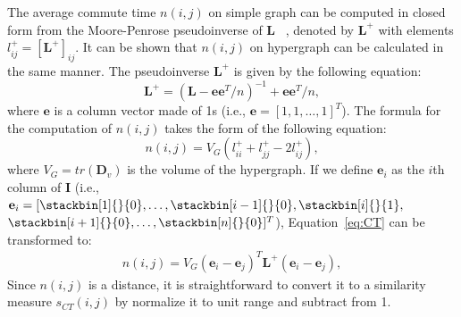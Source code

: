 The average commute time $n(i,j)$ on simple graph can be computed in closed form from the Moore-Penrose pseudoinverse of $\mathbf{L}$ ~\cite{pseudo}, denoted by $\mathbf{L}^+$ with elements $l_{ij}^+=[\mathbf{L}^+]_{ij}$. It can be shown that $n(i,j)$ on hypergraph can be calculated in the same manner. The pseudoinverse $\mathbf{L}^+$ is given by the following equation:
\begin{equation}
\mathbf{L}^+=(\mathbf{L} -\mathbf{ee}^T/n)^{-1} + \mathbf{ee}^T/n, \label{eq:pL}
\end{equation}
where $\mathbf{e}$ is a column vector made of 1s (i.e., $\mathbf{e}=[1,1,\ldots,1]^T$). The formula for the computation of $n(i,j)$ takes the form of the following equation:
\begin{equation}
n(i,j)=V_G(l_{ii}^+ + l_{jj}^+ - 2l_{ij}^+) \label{eq:CT},
\end{equation}
where $V_G = tr(\mathbf{D}_v)$ is the volume of the hypergraph. If we define $\mathbf{e}_i$ as the $i$th column of $\mathbf{I}$ (i.e.,
$
\mathbf{e}_i=[\stackbin[1]{}{0}, \ldots, \stackbin[i-1]{}{0}, \stackbin[i]{}{1},$
$ \stackbin[i+1]{}{0}, \ldots, \stackbin[n]{}{0}]^T
$),
Equation~\ref{eq:CT} can be transformed to:
\begin{align}
n(i,j)=V_G(\mathbf{e}_i-\mathbf{e}_j)^T\mathbf{L}^+(\mathbf{e}_i-\mathbf{e}_j), \label{eq:CT2}
\end{align}
Since $n(i,j)$ is a distance, it is straightforward to convert it to a similarity measure $s_{CT}(i,j)$ by normalize it to unit range and subtract from 1.

